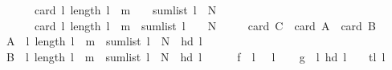 \begin{isabellebody}
\ \ \ \ \ \ card\ {\isacharbraceleft}{\kern0pt}l{\isachardot}{\kern0pt}\ length\ l\ {\isacharequal}{\kern0pt}\ {\isacharparenleft}{\kern0pt}m\ {\isacharminus}{\kern0pt}\ {}{\isacharparenright}{\kern0pt}\ {\isasymand}\ sum{\isacharunderscore}{\kern0pt}list\ l\ {\isacharequal}{\kern0pt}\ N{\isacharbraceright}{\kern0pt}\ {\isacharplus}{\kern0pt}\isanewline
\ \ \ \ \ \ card\ {\isacharbraceleft}{\kern0pt}l{\isachardot}{\kern0pt}\ length\ l\ {\isacharequal}{\kern0pt}\ m\ {\isasymand}\ sum{\isacharunderscore}{\kern0pt}list\ l\ {\isacharplus}{\kern0pt}\ {}\ {\isacharequal}{\kern0pt}\ N{\isacharbraceright}{\kern0pt}{\isachardoublequoteclose}\isanewline
\ \ \ \ {\isacharparenleft}{\kern0pt}\ {\isachardoublequoteopen}card\ {\isacharquery}{\kern0pt}C\ {\isacharequal}{\kern0pt}\ card\ {\isacharquery}{\kern0pt}A\ {\isacharplus}{\kern0pt}\ card\ {\isacharquery}{\kern0pt}B{\isachardoublequoteclose}{\isacharparenright}{\kern0pt}\isanewline
%
\isadelimproof
%
\endisadelimproof
%
\isatagproof
{}\isamarkupfalse%
\ {\isacharminus}{\kern0pt}\isanewline
\ \ \isamarkupfalse%
\ {\isacharquery}{\kern0pt}A{\isacharprime}{\kern0pt}\ {\isacharequal}{\kern0pt}\ {\isachardoublequoteopen}{\isacharbraceleft}{\kern0pt}l{\isachardot}{\kern0pt}\ length\ l\ {\isacharequal}{\kern0pt}\ m\ {\isasymand}\ sum{\isacharunderscore}{\kern0pt}list\ l\ {\isacharequal}{\kern0pt}\ N\ {\isasymand}\ hd\ l\ {\isacharequal}{\kern0pt}\ {}{\isacharbraceright}{\kern0pt}{\isachardoublequoteclose}\isanewline
\ \ \isamarkupfalse%
\ {\isacharquery}{\kern0pt}B{\isacharprime}{\kern0pt}\ {\isacharequal}{\kern0pt}\ {\isachardoublequoteopen}{\isacharbraceleft}{\kern0pt}l{\isachardot}{\kern0pt}\ length\ l\ {\isacharequal}{\kern0pt}\ m\ {\isasymand}\ sum{\isacharunderscore}{\kern0pt}list\ l\ {\isacharequal}{\kern0pt}\ N\ {\isasymand}\ hd\ l\ {\isasymnoteq}\ {}{\isacharbraceright}{\kern0pt}{\isachardoublequoteclose}\isanewline
\ \ \isamarkupfalse%
\ {\isacharquery}{\kern0pt}f\ {\isacharequal}{\kern0pt}\ {\isachardoublequoteopen}{\isasymlambda}l{\isachardot}{\kern0pt}\ {}\ {\isacharhash}{\kern0pt}\ l{\isachardoublequoteclose}\isanewline
\ \ \isamarkupfalse%
\ {\isacharquery}{\kern0pt}g\ {\isacharequal}{\kern0pt}\ {\isachardoublequoteopen}{\isasymlambda}l{\isachardot}{\kern0pt}\ {\isacharparenleft}{\kern0pt}hd\ l\ {\isacharplus}{\kern0pt}\ {}{\isacharparenright}{\kern0pt}\ {\isacharhash}{\kern0pt}\ tl\ l{\isachardoublequoteclose}\isanewline
\ \ \isamarkupfalse%

\end{isabellebody}
